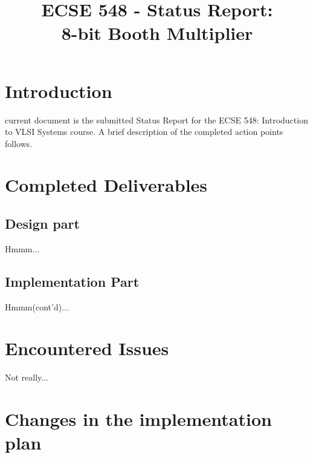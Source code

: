 \documentclass[conference]{IEEEtran}
\begin{document}
\title{ECSE 548 - Status Report:\\8-bit Booth Multiplier}

\author{
}


\maketitle
\IEEEpeerreviewmaketitle

\section{Introduction}
 current document is the 
submitted Status Report for the 
ECSE 548: Introduction to VLSI Systems	
course. A brief description of 
the completed action points follows. 



\section{Completed Deliverables}
\subsection{Design part}

Hmmm...


\subsection{Implementation Part}

Hmmm(cont'd)...


\section{Encountered Issues}

Not really...


\section{Changes in the implementation plan}
\end{document}

